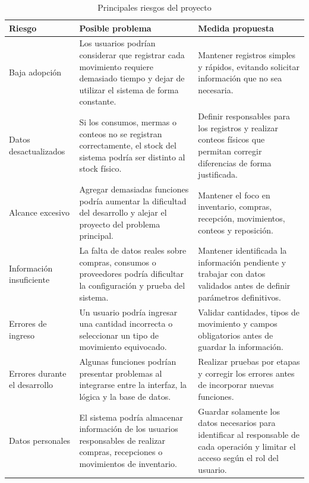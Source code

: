 \documentclass[11pt,letterpaper]{article}
\begin{document}
\begin{table}[H]
\centering
\caption{Principales riesgos del proyecto}
\begin{tabularx}{\textwidth}{p{}XX}
\toprule
\textbf{Riesgo} & \textbf{Posible problema} & \textbf{Medida propuesta} \\
\midrule

Baja adopción &
Los usuarios podrían considerar que registrar cada movimiento requiere demasiado tiempo y dejar de utilizar el sistema de forma constante. &
Mantener registros simples y rápidos, evitando solicitar información que no sea necesaria. \\

Datos desactualizados &
Si los consumos, mermas o conteos no se registran correctamente, el stock del sistema podría ser distinto al stock físico. &
Definir responsables para los registros y realizar conteos físicos que permitan corregir diferencias de forma justificada. \\

Alcance excesivo &
Agregar demasiadas funciones podría aumentar la dificultad del desarrollo y alejar el proyecto del problema principal. &
Mantener el foco en inventario, compras, recepción, movimientos, conteos y reposición. \\

Información insuficiente &
La falta de datos reales sobre compras, consumos o proveedores podría dificultar la configuración y prueba del sistema. &
Mantener identificada la información pendiente y trabajar con datos validados antes de definir parámetros definitivos. \\

Errores de ingreso &
Un usuario podría ingresar una cantidad incorrecta o seleccionar un tipo de movimiento equivocado. &
Validar cantidades, tipos de movimiento y campos obligatorios antes de guardar la información. \\

Errores durante el desarrollo &
Algunas funciones podrían presentar problemas al integrarse entre la interfaz, la lógica y la base de datos. &
Realizar pruebas por etapas y corregir los errores antes de incorporar nuevas funciones. \\

Datos personales &
El sistema podría almacenar información de los usuarios responsables de realizar compras, recepciones o movimientos de inventario. &
Guardar solamente los datos necesarios para identificar al responsable de cada operación y limitar el acceso según el rol del usuario. \\

\bottomrule
\end{tabularx}
\end{table}
\end{document}

